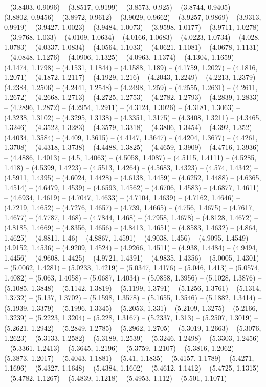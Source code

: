 -- (3.8403, 0.9096) -- (3.8517, 0.9199) -- (3.8573, 0.925) -- (3.8744, 0.9405) -- (3.8802, 0.9456) -- (3.8972, 0.9612) -- (3.9029, 0.9662) -- (3.9257, 0.9869) -- (3.9313, 0.9919) -- (3.9427, 1.0023) -- (3.9484, 1.0073) -- (3.9598, 1.0177) -- (3.9711, 1.0278) -- (3.9768, 1.033) -- (4.0109, 1.0634) -- (4.0166, 1.0683) -- (4.0223, 1.0734) -- (4.028, 1.0783) -- (4.0337, 1.0834) -- (4.0564, 1.1033) -- (4.0621, 1.1081) -- (4.0678, 1.1131) -- (4.0848, 1.1276) -- (4.0906, 1.1325) -- (4.0963, 1.1374) -- (4.1304, 1.1659) -- (4.1474, 1.1798) -- (4.1531, 1.1844) -- (4.1588, 1.189) -- (4.1759, 1.2027) -- (4.1816, 1.2071) -- (4.1872, 1.2117) -- (4.1929, 1.216) -- (4.2043, 1.2249) -- (4.2213, 1.2379) -- (4.2384, 1.2506) -- (4.2441, 1.2548) -- (4.2498, 1.259) -- (4.2555, 1.2631) -- (4.2611, 1.2672) -- (4.2668, 1.2713) -- (4.2725, 1.2753) -- (4.2782, 1.2793) -- (4.2839, 1.2833) -- (4.2896, 1.2872) -- (4.2954, 1.2911) -- (4.3124, 1.3026) -- (4.3181, 1.3063) -- (4.3238, 1.3102) -- (4.3295, 1.3138) -- (4.3351, 1.3175) -- (4.3408, 1.3211) -- (4.3465, 1.3246) -- (4.3522, 1.3283) -- (4.3579, 1.3318) -- (4.3806, 1.3454) -- (4.392, 1.352) -- (4.4034, 1.3584) -- (4.409, 1.3615) -- (4.4147, 1.3647) -- (4.4204, 1.3677) -- (4.4261, 1.3708) -- (4.4318, 1.3738) -- (4.4488, 1.3825) -- (4.4659, 1.3909) -- (4.4716, 1.3936) -- (4.4886, 1.4013) -- (4.5, 1.4063) -- (4.5058, 1.4087) -- (4.5115, 1.4111) -- (4.5285, 1.418) -- (4.5399, 1.4223) -- (4.5513, 1.4264) -- (4.5683, 1.4323) -- (4.574, 1.4342) -- (4.5911, 1.4395) -- (4.6024, 1.4428) -- (4.6138, 1.4459) -- (4.6252, 1.4488) -- (4.6365, 1.4514) -- (4.6479, 1.4539) -- (4.6593, 1.4562) -- (4.6706, 1.4583) -- (4.6877, 1.4611) -- (4.6934, 1.4619) -- (4.7047, 1.4633) -- (4.7104, 1.4639) -- (4.7162, 1.4646) -- (4.7219, 1.4652) -- (4.7276, 1.4657) -- (4.739, 1.4665) -- (4.756, 1.4675) -- (4.7617, 1.4677) -- (4.7787, 1.468) -- (4.7844, 1.468) -- (4.7958, 1.4678) -- (4.8128, 1.4672) -- (4.8185, 1.4669) -- (4.8356, 1.4656) -- (4.8413, 1.4651) -- (4.8583, 1.4632) -- (4.864, 1.4625) -- (4.8811, 1.46) -- (4.8867, 1.4591) -- (4.9038, 1.456) -- (4.9095, 1.4549) -- (4.9152, 1.4536) -- (4.9209, 1.4524) -- (4.9266, 1.4511) -- (4.938, 1.4484) -- (4.9494, 1.4456) -- (4.9608, 1.4425) -- (4.9721, 1.4391) -- (4.9835, 1.4356) -- (5.0005, 1.4301) -- (5.0062, 1.4281) -- (5.0233, 1.4219) -- (5.0347, 1.4176) -- (5.046, 1.413) -- (5.0574, 1.4082) -- (5.063, 1.4058) -- (5.0687, 1.4034) -- (5.0858, 1.3956) -- (5.1028, 1.3876) -- (5.1085, 1.3848) -- (5.1142, 1.3819) -- (5.1199, 1.3791) -- (5.1256, 1.3761) -- (5.1314, 1.3732) -- (5.137, 1.3702) -- (5.1598, 1.3578) -- (5.1655, 1.3546) -- (5.1882, 1.3414) -- (5.1939, 1.3379) -- (5.1996, 1.3345) -- (5.2053, 1.331) -- (5.2109, 1.3275) -- (5.2166, 1.3239) -- (5.2223, 1.3204) -- (5.228, 1.3167) -- (5.2337, 1.313) -- (5.2507, 1.3019) -- (5.2621, 1.2942) -- (5.2849, 1.2785) -- (5.2962, 1.2705) -- (5.3019, 1.2663) -- (5.3076, 1.2623) -- (5.3133, 1.2582) -- (5.3189, 1.2539) -- (5.3246, 1.2498) -- (5.3303, 1.2456) -- (5.3361, 1.2413) -- (5.3645, 1.2196) -- (5.3759, 1.2107) -- (5.3816, 1.2062) -- (5.3873, 1.2017) -- (5.4043, 1.1881) -- (5.41, 1.1835) -- (5.4157, 1.1789) -- (5.4271, 1.1696) -- (5.4327, 1.1648) -- (5.4384, 1.1602) -- (5.4612, 1.1412) -- (5.4725, 1.1315) -- (5.4782, 1.1267) -- (5.4839, 1.1218) -- (5.4953, 1.112) -- (5.501, 1.1071) -- 